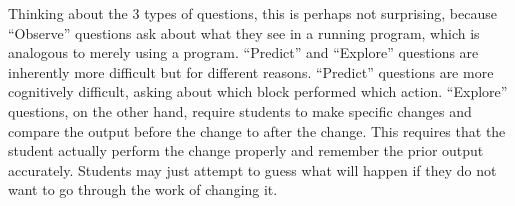 \documentclass[sigconf,manuscript,review,anonymous]{acmart} %
\def\ts{TIPP\&SEE}
\begin{document}
Thinking about the 3 types of questions, this is perhaps not surprising, because ``Observe'' questions ask about what they see in a running program, which is analogous to merely using a program. ``Predict'' and ``Explore'' questions are inherently more difficult but for different reasons. ``Predict'' questions are more cognitively difficult, asking about which block performed which action. ``Explore'' questions, on the other hand, require students to make specific changes and compare the output before the change to after the change. This requires that the student actually perform the change properly and remember the prior output accurately. Students may just attempt to guess what will happen if they do not want to go through the work of changing it.


\end{document}
